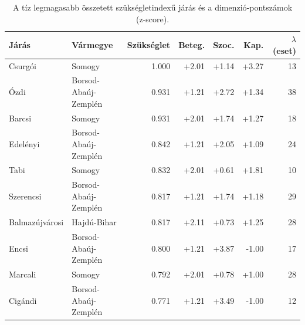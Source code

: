 \begin{table}[htbp]
\centering
\small
\caption{A tíz legmagasabb összetett szükségletindexű járás és a dimenzió‑pontszámok (z‑score).}
\label{tab:needtop}
\begin{tabular}{llrrrrr}
\toprule
Járás & Vármegye & Szükséglet & Beteg. & Szoc. & Kap. & $\lambda$ (eset) \\
\midrule
Csurgói & Somogy & 1.000 & +2.01 & +1.14 & +3.27 & 13 \\
Ózdi & Borsod-Abaúj-Zemplén & 0.931 & +1.21 & +2.72 & +1.34 & 38 \\
Barcsi & Somogy & 0.931 & +2.01 & +1.74 & +1.27 & 18 \\
Edelényi & Borsod-Abaúj-Zemplén & 0.842 & +1.21 & +2.05 & +1.09 & 24 \\
Tabi & Somogy & 0.832 & +2.01 & +0.61 & +1.81 & 10 \\
Szerencsi & Borsod-Abaúj-Zemplén & 0.817 & +1.21 & +1.74 & +1.18 & 29 \\
Balmazújvárosi & Hajdú-Bihar & 0.817 & +2.11 & +0.73 & +1.25 & 28 \\
Encsi & Borsod-Abaúj-Zemplén & 0.800 & +1.21 & +3.87 & -1.00 & 17 \\
Marcali & Somogy & 0.792 & +2.01 & +0.78 & +1.00 & 28 \\
Cigándi & Borsod-Abaúj-Zemplén & 0.771 & +1.21 & +3.49 & -1.00 & 12 \\
\bottomrule
\end{tabular}
\end{table}
